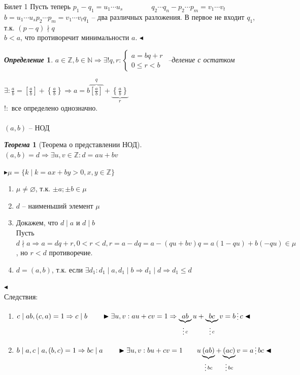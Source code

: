 \documentclass[a4paper,12pt]{article}
\newcommand{\divisible}{\mathop{\raisebox{-2pt}{\vdots}}}
\newtheorem{deff}{\textit{Определение}}
\newtheorem{teo}{\textit{Теорема}}
\newcommand{\q}{\quad}
\newcommand{\pb}{\blacktriangleright}
\newcommand{\pe}{\blacktriangleleft}
\newcommand{\Ra}{\Rightarrow}
\newcommand{\bb}[1]{\mathbb{#1}}
\begin{document}
\newpage
\begin{mybox}{{Билет 1}}
Пусть теперь $p_1 - q_1 = u_1\cdots u_s\q\q\q\q q_2\cdots q_n - p_2\cdots p_m = v_1\cdots v_t$\\
$b = u_1\cdots u_s p_2\cdots p_m = v_1\cdots v_t q_1$ -- два различных разложения. В первое не входит $q_1$, т.к. $(p-q)\nmid q$\\
$b < a$, что противоречит минимальности $a$.
 $\pe$\\
\begin{formbox}{}
\begin{deff} $a\in \bb{Z}, b\in\bb{N}\Rightarrow \exists ! q,r: \begin{cases} a = bq+r\\0 \le r < b\end{cases} $ --деление с остатком
\end{deff}
\end{formbox}
$\exists: \frac{a}{b} = \left[\frac{a}{b}\right] + \left\{\frac{a}{b}\right\}\Rightarrow a = b\overbrace{\left[\frac{a}{b}\right]}^q + \underbrace{\left\{\frac{a}{b}\right\}}_r$\\
$!:$ все определено однозначно.\\\q\\
$(a,b)$ -- НОД

\begin{formbox}{}
\begin{teo}[Теорема о представлении НОД]\q\\
$(a,b) = d \Ra \exists u,v\in\bb{Z}: d = au+bv$
\end{teo}
\end{formbox}
$\pb\mu = \{k\mid k=ax+by>0, x,y\in\bb{Z}\}$\\
\begin{enumerate}
\item $\mu \not= \varnothing$, т.к. $\pm a; \pm b \in\mu$
\item $d$ -- наименьший элемент $\mu$
\item Докажем, что $d\mid a$ и $d\mid b$\\
Пусть $d\nmid a \Ra a = dq+r, 0 < r < d, r = a - dq = a - (qu+bv)q = a(1-qu) + b(-qu)\in \mu$, но $r<d$  противоречие.\\
\item $d = (a,b)$, т.к. если $\exists d_1: d_1\mid a, d_1\mid b\Ra d_1\mid d\Ra d_1 \le d$
\end{enumerate}
$\pe$\\
Следствия:\\
\begin{enumerate}
    \item $c\mid ab, (c,a) = 1\Ra c\mid b\q\q \pb  \exists u,v: au+cv = 1\Ra \underbrace{ab}_{\divisible c}u + \underbrace{bc}_{\divisible c}v = b \divisible c   \pe$
    \item $b\mid a, c\mid a, (b,c) = 1\Ra bc\mid a\q\q    \pb  \exists u,v: bu+cv=1\q\q u\underbrace{(ab)}_{\divisible bc} + \underbrace{(ac)}_{\divisible bc}v = a \divisible bc  \pe$
\end{enumerate}
\end{mybox}
\end{document}
